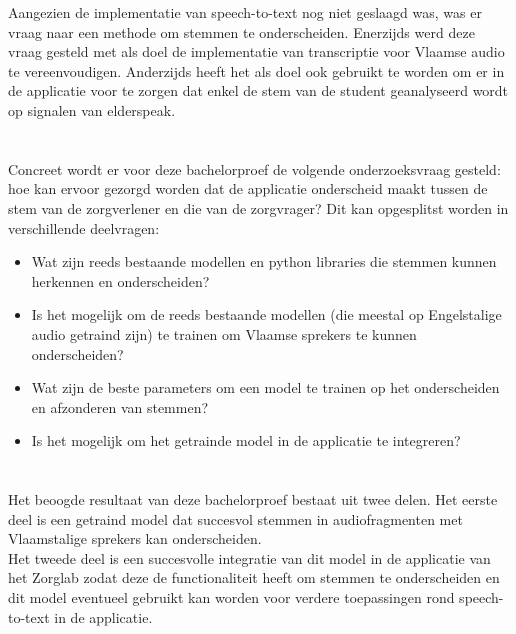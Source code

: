 Aangezien de implementatie van speech-to-text nog niet geslaagd was, was er vraag naar een methode om stemmen te onderscheiden. 
Enerzijds werd deze vraag gesteld met als doel de implementatie van transcriptie voor Vlaamse audio te vereenvoudigen. Anderzijds heeft het als doel ook gebruikt te worden om er in de applicatie voor te zorgen dat enkel de stem van de student geanalyseerd wordt op signalen van elderspeak.

\section{}%
\label{sec:onderzoeksvraag}

Concreet wordt er voor deze bachelorproef de volgende onderzoeksvraag gesteld: hoe kan ervoor gezorgd worden dat de applicatie onderscheid maakt tussen de stem van de zorgverlener en die van de zorgvrager? Dit kan opgesplitst worden in verschillende deelvragen:
\begin{itemize}
	\item Wat zijn reeds bestaande modellen en python libraries die stemmen kunnen herkennen en onderscheiden?
	\item Is het mogelijk om de reeds bestaande modellen (die meestal op Engelstalige audio getraind zijn) te trainen om Vlaamse sprekers te kunnen onderscheiden?
	\item Wat zijn de beste parameters om een model te trainen op het onderscheiden en afzonderen van stemmen?
	\item Is het mogelijk om het getrainde model in de applicatie te integreren?
\end{itemize} 

\section{}%
\label{sec:onderzoeksdoelstelling}

Het beoogde resultaat van deze bachelorproef bestaat uit twee delen. Het eerste deel is een getraind model dat succesvol stemmen in audiofragmenten met Vlaamstalige sprekers kan onderscheiden.\\
Het tweede deel is een succesvolle integratie van dit model in de applicatie van het Zorglab zodat deze de functionaliteit heeft om stemmen te onderscheiden en dit model eventueel gebruikt kan worden voor verdere toepassingen rond speech-to-text in de applicatie.

